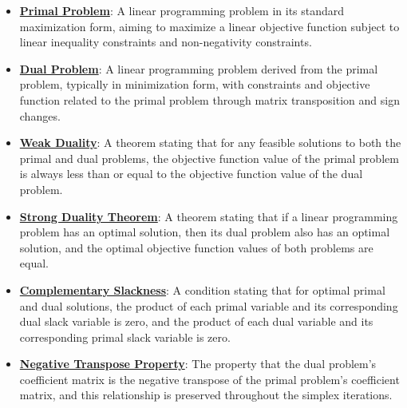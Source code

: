 \documentclass{article}%
\begin{document}
\begin{itemize}[leftmargin=*]%
\item \href{https://www.math.purdue.edu/~yipn/421/2024-09-12-Duality.pdf#page=1}{\textbf{Primal Problem}}: A linear programming problem in its standard maximization form, aiming to maximize a linear objective function subject to linear inequality constraints and non-negativity constraints.%
\item \href{https://www.math.purdue.edu/~yipn/421/2024-09-12-Duality.pdf#page=1}{\textbf{Dual Problem}}: A linear programming problem derived from the primal problem, typically in minimization form, with constraints and objective function related to the primal problem through matrix transposition and sign changes.%
\item \href{https://www.math.purdue.edu/~yipn/421/2024-09-12-Duality.pdf#page=2}{\textbf{Weak Duality}}: A theorem stating that for any feasible solutions to both the primal and dual problems, the objective function value of the primal problem is always less than or equal to the objective function value of the dual problem.%
\item \href{https://www.math.purdue.edu/~yipn/421/2024-09-12-Duality.pdf#page=11}{\textbf{Strong Duality Theorem}}: A theorem stating that if a linear programming problem has an optimal solution, then its dual problem also has an optimal solution, and the optimal objective function values of both problems are equal.%
\item \href{https://www.math.purdue.edu/~yipn/421/2024-09-12-Duality.pdf#page=5}{\textbf{Complementary Slackness}}: A condition stating that for optimal primal and dual solutions, the product of each primal variable and its corresponding dual slack variable is zero, and the product of each dual variable and its corresponding primal slack variable is zero.%
\item \href{https://www.math.purdue.edu/~yipn/421/2024-09-12-Duality.pdf#page=6}{\textbf{Negative Transpose Property}}: The property that the dual problem's coefficient matrix is the negative transpose of the primal problem's coefficient matrix, and this relationship is preserved throughout the simplex iterations.%
\end{itemize}%
\end{document}

